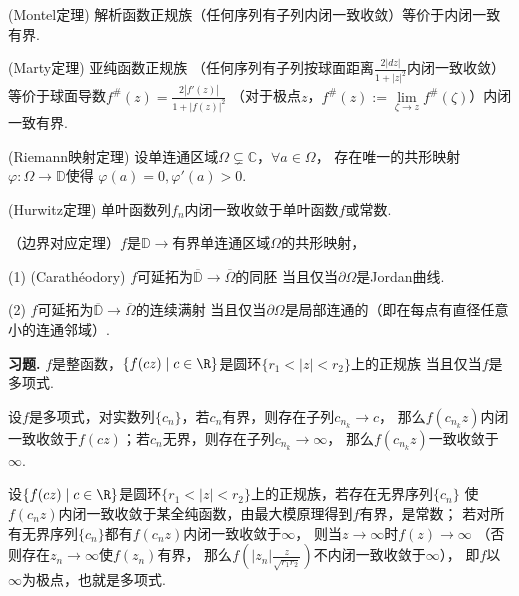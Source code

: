\begin{proposition}(Montel定理) 解析函数正规族（任何序列有子列内闭一致收敛）等价于内闭一致有界.\end{proposition}

\begin{proposition}(Marty定理) 亚纯函数正规族
（任何序列有子列按球面距离$\frac{2|dz|}{1+|z|^2}$内闭一致收敛）
等价于球面导数$f^\#(z)=\frac{2|f'(z)|}{1+|f(z)|^2}$
（对于极点$z$，$f^\#(z):=\lim\limits_{\zeta\rightarrow z}f^\#(\zeta)$）内闭一致有界.\end{proposition}

\begin{proposition}(Riemann映射定理) 设单连通区域$\Omega\subsetneq\mathbb{C}$，$\forall a\in\Omega$，
存在唯一的共形映射$\varphi\colon\Omega\rightarrow\mathbb{D}$使得
$\varphi(a)=0,\varphi'(a)>0$.\end{proposition}

\begin{proposition}(Hurwitz定理) 单叶函数列$f_n$内闭一致收敛于单叶函数$f$或常数.\end{proposition}

\begin{proposition}（边界对应定理）$f$是$\mathbb{D}\rightarrow$有界单连通区域$\Omega$的共形映射，

(1) (Carathéodory) $f$可延拓为$\overline{\mathbb{D}}\rightarrow\overline{\Omega}$的同胚
当且仅当$\partial\Omega$是Jordan曲线.

(2) $f$可延拓为$\overline{\mathbb{D}}\rightarrow\overline{\Omega}$的连续满射
当且仅当$\partial\Omega$是局部连通的（即在每点有直径任意小的连通邻域）.\end{proposition}

\textbf{习题. } $f$是整函数，$\{f(cz)\mid c\in\R\}$是圆环$\{r_1<|z|<r_2\}$上的正规族
当且仅当$f$是多项式.

\begin{proofc}
    设$f$是多项式，对实数列$\{c_n\}$，若$c_n$有界，则存在子列$c_{n_k}\rightarrow c$，
    那么$f(c_{n_k}z)$内闭一致收敛于$f(cz)$；若$c_n$无界，则存在子列$c_{n_k}\rightarrow\infty$，
    那么$f(c_{n_k}z)$一致收敛于$\infty$.

    设$\{f(cz)\mid c\in\R\}$是圆环$\{r_1<|z|<r_2\}$上的正规族，若存在无界序列$\{c_n\}$
    使$f(c_nz)$内闭一致收敛于某全纯函数，由最大模原理得到$f$有界，是常数；
    若对所有无界序列$\{c_n\}$都有$f(c_nz)$内闭一致收敛于$\infty$，
    则当$z\rightarrow\infty$时$f(z)\rightarrow\infty$
    （否则存在$z_n\rightarrow\infty$使$f(z_n)$有界，
    那么$f(|z_n|\frac{z}{\sqrt{r_1r_2}})$不内闭一致收敛于$\infty$），
    即$f$以$\infty$为极点，也就是多项式.
\end{proofc}

